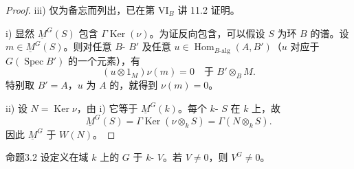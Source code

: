 \begin{proof}
iii) 仅为备忘而列出，已在第 VI$_B$ 讲 11.2 证明。

i) 显然 $\underline M^G(S)$ 包含 $\Gamma\operatorname{Ker}(\nu)$。为证反向包含，可以假设 $S$ 为环 $B$ 的谱。设 $m\in \underline M^G(S)$。则对任意 $B$- $B'$ 及任意 $u\in\operatorname{Hom}_{B\text{-alg}}(A,B')$（$u$ 对应于 $G(\operatorname{Spec}B')$ 的一个元素），有
\[(u\otimes1_M)\nu(m)=0\quad\text{于 }B'\otimes_BM.\]
特别取 $B'=A$，$u$ 为 $A$ 的，就得到 $\nu(m)=0$。

ii) 设 $N=\operatorname{Ker}\nu$，由 i) 它等于 $\underline M^G(k)$。每个 $k$- $S$ 在 $k$ 上，故
\[\underline M^G(S)=\Gamma\operatorname{Ker}(\nu\otimes_k S)=\Gamma(N\otimes_k S).\]
因此 $\underline M^G$ 于 $W(N)$。
\end{proof}
\begin{SGAresult}{命题}{3.2}
设定义在域 $k$ 上的 $G$ 于 $k$- $V$。若 $V\ne0$，则 $V^G\ne0$。
\end{SGAresult}

